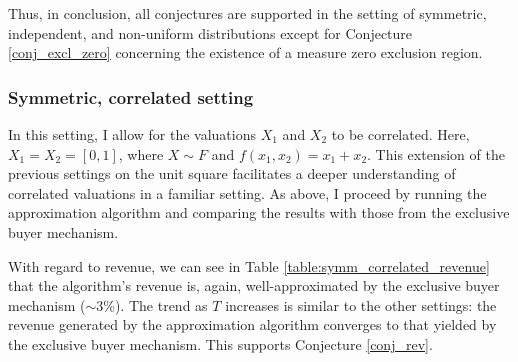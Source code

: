 \documentclass{article}
\newcounter{fig}
\begin{document}



  

Thus, in conclusion, all conjectures are supported in the setting of symmetric, independent, and non-uniform distributions except for Conjecture \ref{conj_excl_zero} concerning the existence of a measure zero exclusion region.







\subsubsection{Symmetric, correlated setting}

In this setting, I allow for the valuations $X_1$ and $X_2$ to be correlated. Here, $X_1 = X_2 = [0,1]$, where $X \sim F$ and $f(x_1,x_2) = x_1+x_2$. This extension of the previous settings on the unit square facilitates a deeper understanding of correlated valuations in a familiar setting. As above, I proceed by running the approximation algorithm and comparing the results with those from the exclusive buyer mechanism.

With regard to revenue, we can see in Table \ref{table:symm_correlated_revenue} that the algorithm's revenue is, again, well-approximated by the exclusive buyer mechanism ($\sim$3\%). The trend as $T$ increases is similar to the other settings: the revenue generated by the approximation algorithm converges to that yielded by the exclusive buyer mechanism. This supports Conjecture \ref{conj_rev}.
\end{document}
